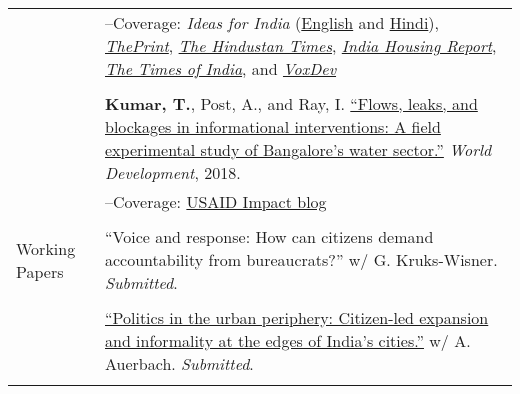 \documentclass[letterpaper, 10.5pt]{article}
\begin{document}
\begin{longtable}{p{1.5in}p{5in}}
&--\indent Coverage: \textit{Ideas for India} (\href{https://www.ideasforindia.in/topics/poverty-inequality/household-level-effects-of-affordable-housing-evidence-from-mumbai.html}{English} and \href{https://www.ideasforindia.in/topics/poverty-inequality/household-level-effects-of-affordable-housing-evidence-from-mumbai-hindi.html}{Hindi}), \href{https://theprint.in/opinion/mumbai-residents-win-govt-housing-lottery-and-spend-more-on-kids-education-jobs-study/290485/}{\textit{ThePrint}}, \href{https://www.hindustantimes.com/opinion/housing-is-a-welfare-weapon-it-can-help-people-escape-poverty-101629993983576.html}{\textit{The Hindustan Times}}, \href{https://indiahousingreport.in/outputs/opinion/housing-is-a-welfare-weapon-it-can-help-people-escape-poverty/}{\textit{India Housing Report}}, \href{https://timesofindia.indiatimes.com/city/mumbai/mhada-home-winners-see-upswing-in-family-edu-pay-in-mumbai-study/articleshow/86468320.cms}{\textit{The Times of India}}, and \href{https://voxdev.org/topic/infrastructure-urbanisation/household-level-effects-subsidised-housing-evidence-urban-india?utm_source=dlvr.it&utm_medium=twitter}{\textit{VoxDev}} \\
& \\

&\textbf{Kumar, T.}, Post, A., and Ray, I. \href{https://www.sciencedirect.com/science/article/pii/S0305750X1830032}{``Flows, leaks, and blockages in informational interventions: A field experimental study of Bangalore's water sector.''} \textit{World Development}, 2018.\\

&--\indent Coverage: \href{https://blog.usaid.gov/2016/05/using-mobile-phones-to-alert-households-waiting-for-nextdrop-of-water/}{USAID Impact blog} \\
& \\


Working Papers

&``Voice and response:
How can citizens demand accountability from bureaucrats?'' w/ G. Kruks-Wisner. \textit{Submitted}.\\
& \\


& \href{https://gld.gu.se/media/2985/gld_workingpaper_63_auerbachkumar_202303.pdf}{``Politics in the urban periphery: Citizen-led expansion and informality at the edges of India's cities.''} w/ A. Auerbach.  \textit{Submitted}.\\
& \\


\end{longtable}
\end{document}
